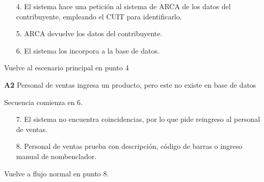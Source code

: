 \begin{enumerate}
	\item[4.] El sistema hace una petición al sistema de ARCA de los datos del contribuyente, 
	empleando el CUIT para identificarlo.
	\item[5.] ARCA devuelve los datos del contribuyente.
	\item[6.] El sistema los incorpora a la base de datos.
\end{enumerate}

Vuelve al escenario principal en punto 4

\textbf{A2} Personal de ventas ingresa un producto, pero este no existe en base de datos

Secuencia comienza en 6.

\begin{enumerate}
	\item[7.] El sistema no encuentra coincidencias, por lo que pide reingreso al personal de ventas.
	\item[8.] Personal de ventas prueba con descripción, código de barras o ingreso manual de nombenclador.
\end{enumerate}

Vuelve a flujo normal en punto 8.
